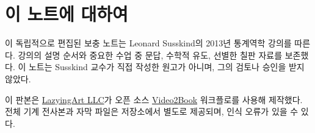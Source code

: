 \documentclass[11pt,oneside]{book}
\begin{document}
\frontmatter
\hypersetup{pageanchor=false}

\hypersetup{pageanchor=true}

\chapter{이 노트에 대하여}
이 독립적으로 편집된 보충 노트는 Leonard Susskind의 2013년 통계역학 강의를 따른다. 강의의 설명 순서와 중요한 수업 중 문답, 수학적 유도, 선별한 칠판 자료를 보존했다. 이 노트는 Susskind 교수가 직접 작성한 원고가 아니며, 그의 검토나 승인을 받지 않았다.

이 판본은 \href{https://lazying.art}{LazyingArt LLC}가 오픈 소스 \href{https://github.com/lachlanchen/Video2Book}{Video2Book} 워크플로를 사용해 제작했다. 전체 기계 전사본과 자막 파일은 저장소에서 별도로 제공되며, 인식 오류가 있을 수 있다.
\clearpage
\tableofcontents
\mainmatter










\end{document}
